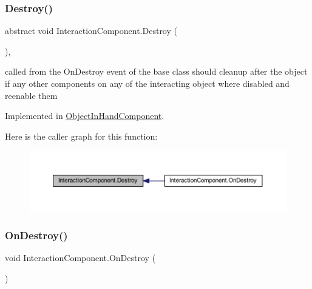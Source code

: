 \subsubsection{\texorpdfstring{Destroy()}{Destroy()}}
{\footnotesize\ttfamily abstract void Interaction\+Component.\+Destroy (\begin{DoxyParamCaption}{ }\end{DoxyParamCaption})\hspace{0.3cm}{\ttfamily [protected]}, {}}



called from the On\+Destroy event of the base class should cleanup after the object if any other components on any of the interacting object where disabled and reenable them 



Implemented in \mbox{\hyperlink{class_object_in_hand_component_a932b69c4977ec0836389b71a6aa1366c}{Object\+In\+Hand\+Component}}.

Here is the caller graph for this function\+:
\nopagebreak
\begin{figure}[H]
\begin{center}
\leavevmode
\includegraphics[width=350pt]{class_interaction_component_aa28f5c9f92b342c3d52f8b0b251fb4fa_icgraph}
\end{center}
\end{figure}
\mbox{\label{class_interaction_component_a3add77b0cb9df6b962ea2c66d317fa46}} 
\subsubsection{\texorpdfstring{On\+Destroy()}{OnDestroy()}}
{\footnotesize\ttfamily void Interaction\+Component.\+On\+Destroy (\begin{DoxyParamCaption}{ }\end{DoxyParamCaption})\hspace{0.3cm}{\ttfamily [private]}}


